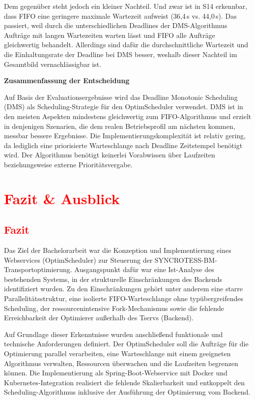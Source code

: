 \documentclass[
    12pt,               
    a4paper,            
    ngerman,            
    parskip=half,       
    headings=normal,   
    numbers=enddot,     
    toc=chapterentrywithdots 
]{scrreprt}\usepackage[utf8]{inputenc}
\begin{document}
Dem gegenüber steht jedoch ein kleiner Nachteil. Und zwar ist in S14 erkennbar, dass FIFO eine geringere maximale Wartezeit aufweist (36{,}4\,s vs. 44{,}0\,s). Das passiert, weil durch die unterschiedlichen Deadlines der DMS-Algorithmus Aufträge mit langen Wartezeiten warten lässt und FIFO alle Aufträge gleichwertig behandelt. Allerdings sind dafür die durchschnittliche Wartezeit und die Einhaltungsrate der Deadline bei DMS besser, weshalb dieser Nachteil im Gesamtbild vernachlässigbar ist.

\textbf{Zusammenfassung der Entscheidung}

Auf Basis der Evaluationsergebnisse wird das Deadline Monotonic Scheduling (DMS) als Scheduling-Strategie für den OptimScheduler verwendet. DMS ist in den meisten Aspekten mindestens gleichwertig zum FIFO-Algorithmus und erzielt in denjenigen Szenarien, die dem realen Betriebsprofil am nächsten kommen, messbar bessere Ergebnisse. Die Implementierungskomplexität ist relativ gering, da lediglich eine priorisierte Warteschlange nach Deadline Zeitstempel benötigt wird. Der Algorithmus benötigt keinerlei Vorabwissen über Laufzeiten beziehungsweise externe Prioritätsvergabe.

\chapter{\textcolor{red}{Fazit \& Ausblick}}

\section{\textcolor{red}{Fazit}}
Das Ziel der Bachelorarbeit war die Konzeption und Implementierung eines Webservices (OptimScheduler) zur Steuerung der SYNCROTESS-BM-Transportoptimierung. Ausgangspunkt dafür war eine Ist-Analyse des bestehenden Systems, in der strukturelle Einschränkungen des Backends identifiziert wurden. Zu den Einschränkungen gehört unter anderem eine starre Parallelitätsstruktur, eine isolierte FIFO-Warteschlange ohne typübergreifendes Scheduling, der ressourcenintensive Fork-Mechanismus sowie die fehlende Erreichbarkeit der Optimierer außerhalb des Tservs (Backend).

Auf Grundlage dieser Erkenntnisse wurden anschließend funktionale und technische Anforderungen definiert. Der OptimScheduler soll die Aufträge für die Optimierung parallel verarbeiten, eine Warteschlange mit einem geeigneten Algorithmus verwalten, Ressourcen überwachen und die Laufzeiten begrenzen können. Die Implementierung als Spring-Boot-Webservice mit Docker und Kubernetes-Integration realisiert die fehlende Skalierbarkeit und entkoppelt den Scheduling-Algorithmus inklusive der Ausführung der Optimierung vom Backend.
\end{document}
